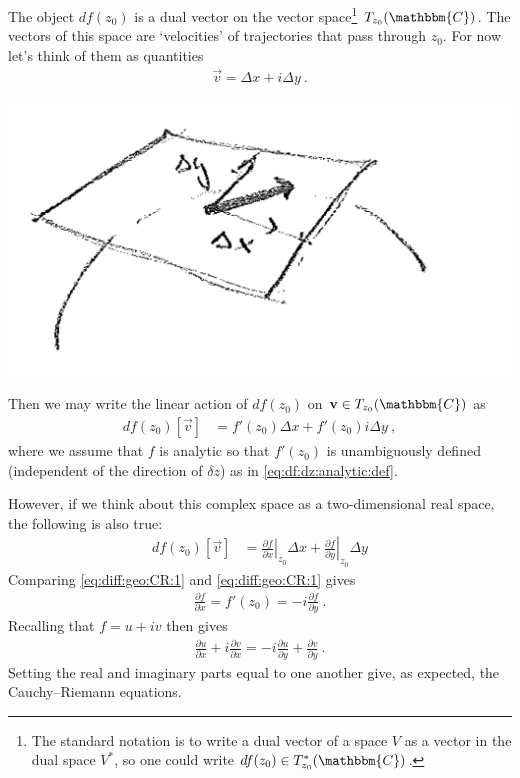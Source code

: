 The object $df(z_0)$ is a dual vector on the vector space\footnote{The standard notation is to write a dual vector of a space $V$ as a vector in the dual space $V^*$, so one could write $df(z_0) \in T^*_{z_0}(\mathbbm{C})$.} $T_{z_0}(\mathbbm{C})$.  The vectors of this space are `velocities' of trajectories that pass through $z_0$. For now let's think of them as quantities
\begin{align}
	\vec v = \Delta x + i \Delta y \ .
\end{align}
\begin{center}
\includegraphics[width=.5\textwidth]{figures/lec13_tanvec.png}
\end{center}
Then we may write the linear action of $df(z_0)$ on $\vec v \in T_{z_0}(\mathbbm{C})$ as
\begin{align}
	df(z_0)\left[\vec{v}\right] &=
	f'(z_0)\Delta x + f'(z_0)i\Delta y \ ,
	\label{eq:diff:geo:CR:1}
\end{align}
where we assume that $f$ is analytic so that $f'(z_0)$ is unambiguously defined (independent of the direction of $\delta z$) as in \eqref{eq:df:dz:analytic:def}. 

However, if we think about this complex space as a two-dimensional real space, the following is also true:
\begin{align}
	df(z_0)\left[\vec{v}\right] &=
	\left.\frac{\partial f}{\partial x}\right|_{z_0} \Delta x
	+
	\left.\frac{\partial f}{\partial y}\right|_{z_0} \Delta y
	\label{eq:diff:geo:CR:2}
\end{align}
Comparing \eqref{eq:diff:geo:CR:1} and \eqref{eq:diff:geo:CR:1} gives 
\begin{align}
	\frac{\partial f}{\partial x} = f'(z_0) = - i\frac{\partial f}{\partial y} \ .
\end{align}
Recalling that $f= u+iv$ then gives
\begin{align}
	\frac{\partial u}{\partial x}
	+ i
	\frac{\partial v}{\partial x}
	=
	-i
	\frac{\partial u}{\partial y}
	+
	\frac{\partial v}{\partial y} \ .
\end{align}
Setting the real and imaginary parts equal to one another give, as expected, the Cauchy--Riemann equations. 

